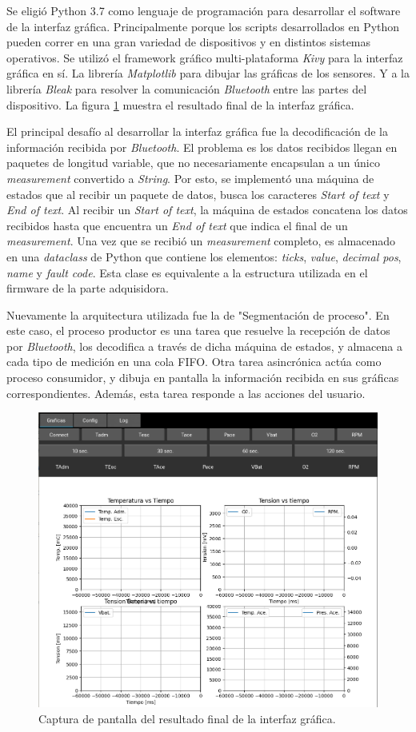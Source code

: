 Se eligió Python 3.7 como lenguaje de programación para desarrollar el software de la interfaz gráfica. Principalmente porque los scripts desarrollados en Python pueden correr en una gran variedad de dispositivos y en distintos sistemas operativos. Se utilizó el framework gráfico multi-plataforma \textit{Kivy} para la interfaz gráfica en sí. La librería \textit{Matplotlib} para dibujar las gráficas de los sensores. Y a la librería \textit{Bleak} para resolver la comunicación \textit{Bluetooth} entre las partes del dispositivo. La figura \ref{fig:gui} muestra el resultado final de la interfaz gráfica.

El principal desafío al desarrollar la interfaz gráfica fue la decodificación de la información recibida por \textit{Bluetooth}. El problema es los datos recibidos llegan en paquetes de longitud variable, que no necesariamente encapsulan a un único \textit{measurement} convertido a \textit{String}. Por esto, se implementó una máquina de estados que al recibir un paquete de datos, busca los caracteres \textit{Start of text} y \textit{End of text}. Al recibir un \textit{Start of text}, la máquina de estados concatena los datos recibidos hasta que encuentra un \textit{End of text} que indica el final de un \textit{measurement}. Una vez que se recibió un \textit{measurement} completo, es almacenado en una \textit{dataclass} de Python que contiene los elementos: \textit{ticks}, \textit{value}, \textit{decimal pos}, \textit{name} y \textit{fault code}. Esta clase es equivalente a la estructura utilizada en el firmware de la parte adquisidora.

Nuevamente la arquitectura utilizada fue la de "Segmentación de proceso". En este caso, el proceso productor es una tarea que resuelve la recepción de datos por \textit{Bluetooth}, los decodifica a través de dicha máquina de estados, y almacena a cada tipo de medición en una cola FIFO. Otra tarea asincrónica actúa como proceso consumidor, y dibuja en pantalla la información recibida en sus gráficas correspondientes. Además, esta tarea responde a las acciones del usuario.

\begin{figure}[htpb]
\centering
\includegraphics[width=.9\textwidth]{./Figures/gui.png}
\caption{Captura de pantalla del resultado final de la interfaz gráfica.}
\label{fig:gui}
\end{figure}

